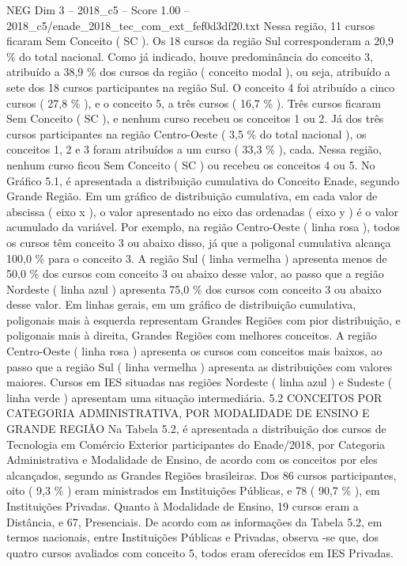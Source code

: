 \begin{textsample}{NEG Dim 3 – 2018\_c5 – Score 1.00 – 2018\_c5/enade\_2018\_tec\_com\_ext\_fef0d3df20.txt}
Nessa região, 11 cursos ficaram Sem Conceito ( SC ).
Os 18 cursos da região Sul corresponderam a 20,9 \% do total nacional.
Como já indicado, houve predominância do conceito 3, atribuído a 38,9 \% dos cursos da região ( conceito modal ), ou seja, atribuído a sete dos 18 cursos participantes na região Sul.
O conceito 4 foi atribuído a cinco cursos ( 27,8 \% ), e o conceito 5, a três cursos ( 16,7 \% ).
Três cursos ficaram Sem Conceito ( SC ), e nenhum curso recebeu os conceitos 1 ou 2.
Já dos três cursos participantes na região Centro-Oeste ( 3,5 \% do total nacional ), os conceitos 1, 2 e 3 foram atribuídos a um curso ( 33,3 \% ), cada.
Nessa região, nenhum curso ficou Sem Conceito ( SC ) ou recebeu os conceitos 4 ou 5.
No Gráfico 5.1, é apresentada a distribuição cumulativa do Conceito Enade, segundo Grande Região.
Em um gráfico de distribuição cumulativa, em cada valor de abscissa ( eixo x ), o valor apresentado no eixo das ordenadas ( eixo y ) é o valor acumulado da variável.
Por exemplo, na região Centro-Oeste ( linha rosa ), todos os cursos têm conceito 3 ou abaixo disso, já que a poligonal cumulativa alcança 100,0 \% para o conceito 3.
A região Sul ( linha vermelha ) apresenta menos de 50,0 \% dos cursos com conceito 3 ou abaixo desse valor, ao passo que a região Nordeste ( linha azul ) apresenta 75,0 \% dos cursos com conceito 3 ou abaixo desse valor.
Em linhas gerais, em um gráfico de distribuição cumulativa, poligonais mais à esquerda representam Grandes Regiões com pior distribuição, e poligonais mais à direita, Grandes Regiões com melhores conceitos.
A região Centro-Oeste ( linha rosa ) apresenta os cursos com conceitos mais baixos, ao passo que a região Sul ( linha vermelha ) apresenta as distribuições com valores maiores.
Cursos em IES situadas nas regiões Nordeste ( linha azul ) e Sudeste ( linha verde ) apresentam uma situação intermediária. 5.2 CONCEITOS POR CATEGORIA ADMINISTRATIVA, POR MODALIDADE DE ENSINO E GRANDE REGIÃO Na Tabela 5.2, é apresentada a distribuição dos cursos de Tecnologia em Comércio Exterior participantes do Enade/2018, por Categoria Administrativa e Modalidade de Ensino, de acordo com os conceitos por eles alcançados, segundo as Grandes Regiões brasileiras.
Dos 86 cursos participantes, oito ( 9,3 \% ) eram ministrados em Instituições Públicas, e 78 ( 90,7 \% ), em Instituições Privadas.
Quanto à Modalidade de Ensino, 19 cursos eram a Distância, e 67, Presenciais.
De acordo com as informações da Tabela 5.2, em termos nacionais, entre Instituições Públicas e Privadas, observa -se que, dos quatro cursos avaliados com conceito 5, todos eram oferecidos em IES Privadas.

\end{textsample}
